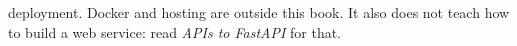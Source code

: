 \documentclass[10pt, twoside, openany]{book}
\begin{document}
  {deployment. Docker and hosting are outside this book. It also does not teach how to
   build a web service: read \textit{APIs to FastAPI} for that.}
%
%
%
%
%
%
%
%
%
%
%
%
%
%
%
%
%

%
%
%
%
%
%

\appendix

\backmatter
\printindex


\end{document}
